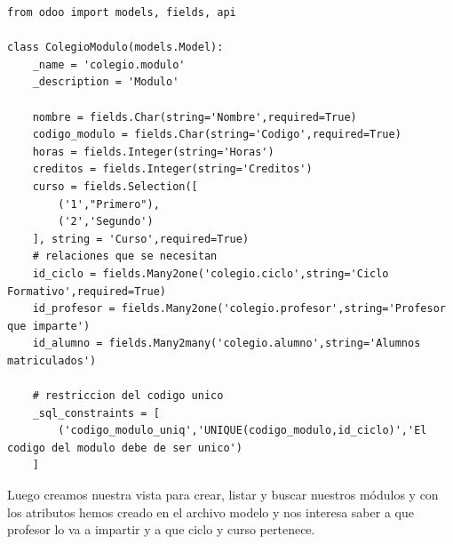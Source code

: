 \documentclass[a4paper,12pt]{article}
\begin{document}
\vspace{0.5cm}
\begin{lstlisting}[style=javascript]
from odoo import models, fields, api

class ColegioModulo(models.Model):
    _name = 'colegio.modulo'
    _description = 'Modulo'

    nombre = fields.Char(string='Nombre',required=True)
    codigo_modulo = fields.Char(string='Codigo',required=True)
    horas = fields.Integer(string='Horas')
    creditos = fields.Integer(string='Creditos')
    curso = fields.Selection([
        ('1',"Primero"),
        ('2','Segundo')
    ], string = 'Curso',required=True)
    # relaciones que se necesitan 
    id_ciclo = fields.Many2one('colegio.ciclo',string='Ciclo Formativo',required=True)
    id_profesor = fields.Many2one('colegio.profesor',string='Profesor que imparte')
    id_alumno = fields.Many2many('colegio.alumno',string='Alumnos matriculados')

    # restriccion del codigo unico
    _sql_constraints = [
        ('codigo_modulo_uniq','UNIQUE(codigo_modulo,id_ciclo)','El codigo del modulo debe de ser unico')
    ]
\end{lstlisting}

Luego creamos nuestra vista para crear, listar y buscar nuestros módulos y con los atributos hemos creado en el archivo modelo y nos interesa saber a que profesor lo va a impartir y a que ciclo y curso pertenece.
\end{document}
